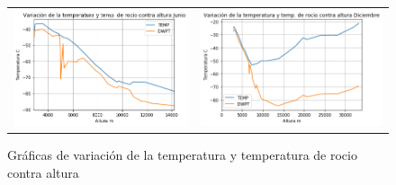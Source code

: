 \documentclass[a4paper]{article}
\begin{document}
\begin{figure}[h]
\begin{tabular}{ll}
\includegraphics[scale=0.5]{grafica5.png}
&
\includegraphics[scale=0.5]{grafica6.png}
\end{tabular}
\caption{Gráficas de variación de la temperatura y temperatura de rocio contra altura}

\end{figure}
\end{document}
